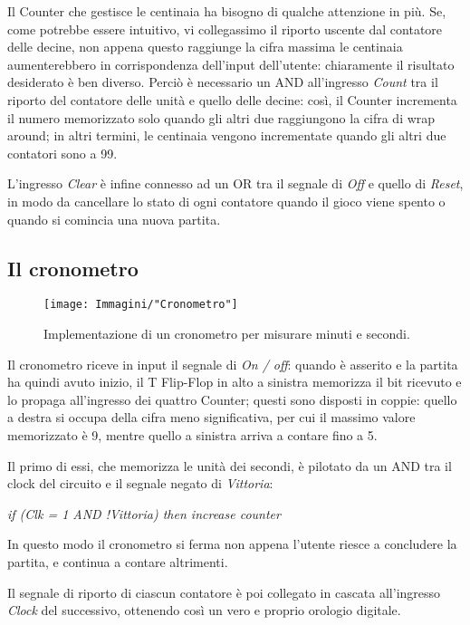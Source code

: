 \documentclass[11pt]{article}
\begin{document}
Il Counter che gestisce le centinaia ha bisogno di qualche attenzione in più.
Se, come potrebbe essere intuitivo, vi collegassimo il riporto uscente dal contatore delle decine, non appena questo raggiunge la cifra massima le centinaia aumenterebbero in corrispondenza dell'input dell'utente: chiaramente il risultato desiderato è ben diverso. Perciò è necessario un AND all'ingresso {\itshape Count} tra il riporto del contatore delle unità e quello delle decine: così, il Counter incrementa il numero memorizzato solo quando gli altri due raggiungono la cifra di wrap around; in altri termini, le centinaia vengono incrementate quando gli altri due contatori sono a 99.

L'ingresso {\itshape Clear} è infine connesso ad un OR tra il segnale di {\itshape Off} e quello di {\itshape Reset}, in modo da cancellare lo stato di ogni contatore quando il gioco viene spento o quando si comincia una nuova partita.


\subsection{Il cronometro}
\hfill

\begin{figure}[H]
\centering
\texttt{[image: Immagini/"Cronometro"]}
\caption{{\small Implementazione di un cronometro per misurare minuti e secondi.}}
\label{fig:cronometro}
\end{figure}

Il cronometro riceve in input il segnale di {\itshape On / off}: quando è asserito e la partita ha quindi avuto inizio, il T Flip-Flop in alto a sinistra memorizza il bit ricevuto e lo propaga all'ingresso dei quattro Counter; questi sono disposti in coppie: quello a destra si occupa della cifra meno significativa, per cui il massimo valore memorizzato è 9, mentre quello a sinistra arriva a contare fino a 5.

Il primo di essi, che memorizza le unità dei secondi, è pilotato da un AND tra il clock del circuito e il segnale negato di {\itshape Vittoria}: 

{\itshape if (Clk = 1 AND !Vittoria) then increase counter}

In questo modo il cronometro si ferma non appena l'utente riesce a concludere la partita, e continua a contare altrimenti.

Il segnale di riporto di ciascun contatore è poi collegato in cascata all'ingresso {\itshape Clock} del successivo, ottenendo così un vero e proprio orologio digitale.
\end{document}
